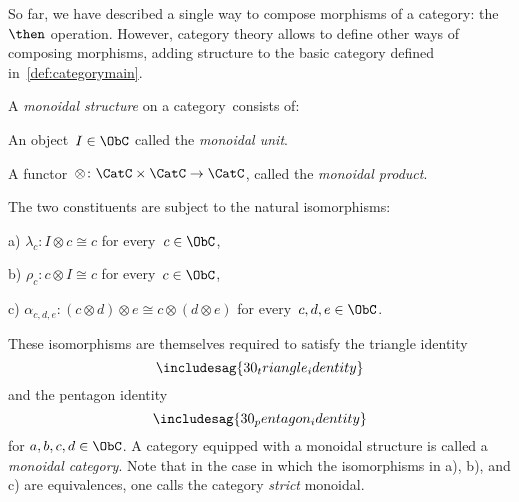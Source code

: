 So far, we have described a single way to compose morphisms of a category: the~$\then$ operation. However, category theory allows to define other ways of composing morphisms, adding structure to the basic category defined in~\cref{def:categorymain}.
\begin{ctdefinition}
    \label{def:monoidal_cat}
    A \emph{monoidal structure} on a category~\CatC consists of:
    \begin{compactenum}
        \item An object~$I\in \ObC$ called the \emph{monoidal unit}.
        \item A functor~$\otimes \colon \CatC \times \CatC\to \CatC$, called the \emph{monoidal product}.
    \end{compactenum}
    The two constituents are subject to the natural isomorphisms:
    \begin{compactenum}
        \item[a)] $\lambda_c \colon I\otimes c \cong c$ for every~$c\in \ObC$,
        \item[b)] $\rho_c \colon c\otimes I \cong c$ for every~$c\in \ObC$,
        \item[c)] $\alpha_{c,d,e}\colon (c\otimes d)\otimes e \cong c\otimes (d\otimes e)$ for every~$c,d,e\in \ObC$.
    \end{compactenum}
    These isomorphisms are themselves required to satisfy the triangle identity
    \begin{equation}
        \includesag{30_triangle_identity}
    \end{equation}
    and the pentagon identity
    \begin{equation}
        \includesag{30_pentagon_identity}
    \end{equation}
    for $a,b,c,d\in \ObC$.
    \noindent A category equipped with a monoidal structure is called a \emph{monoidal category}. Note that in the case in which the isomorphisms in a), b), and c) are equivalences, one calls the category \emph{strict} monoidal.
\end{ctdefinition}

